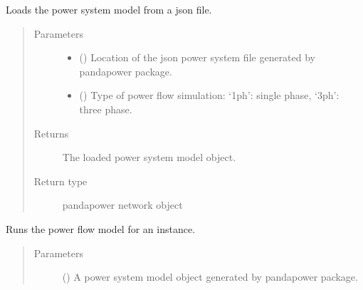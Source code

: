 \documentclass[letterpaper,10pt,english]{sphinxmanual}
\begin{document}
\begin{fulllineitems}
\label{\detokenize{apidoc:dreaminsg_integrated_model.src.network_sim_models.power.power_system_model.load_power_network}}
\sphinxAtStartPar
Loads the power system model from a json file.
\begin{quote}\begin{description}
\item[{Parameters}] \leavevmode\begin{itemize}
\item {} 
\sphinxAtStartPar
{} () \textendash{} Location of the json power system file generated by pandapower package.

\item {} 
\sphinxAtStartPar
{} () \textendash{} Type of power flow simulation: ‘1ph’: single phase, ‘3ph’: three phase.

\end{itemize}

\item[{Returns}] \leavevmode
\sphinxAtStartPar
The loaded power system model object.

\item[{Return type}] \leavevmode
\sphinxAtStartPar
pandapower network object

\end{description}\end{quote}

\end{fulllineitems}


\begin{fulllineitems}
\label{\detokenize{apidoc:dreaminsg_integrated_model.src.network_sim_models.power.power_system_model.run_power_simulation}}
\sphinxAtStartPar
Runs the power flow model for an instance.
\begin{quote}\begin{description}
\item[{Parameters}] \leavevmode
\sphinxAtStartPar
{} () \textendash{} A power system model object generated by pandapower package.

\end{description}\end{quote}

\end{fulllineitems}
\end{document}
